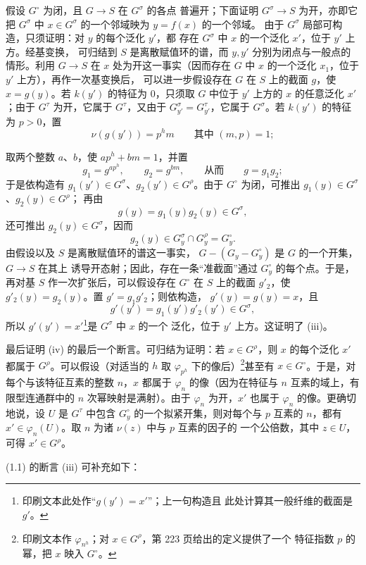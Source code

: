 假设 $G^\circ$ 为闭，且 $G\longrightarrow S$ 在 $G^\sigma$ 的各点
普遍开；下面证明 $G^\sigma\longrightarrow S$ 为开，亦即它把
$G^\sigma$ 中 $x\in G^\sigma$ 的一个邻域映为 $y=f(x)$ 的一个邻域。
由于 $G^\sigma$ 局部可构造，只须证明：对 $y$ 的每个泛化 $y'$，都
存在 $G^\sigma$ 中 $x$ 的一个泛化 $x'$，位于 $y'$ 上方。经基变换，
可归结到 $S$ 是离散赋值环的谱，而 $y,y'$ 分别为闭点与一般点的
情形。利用 $G\longrightarrow S$ 在 $x$ 处为开这一事实（因而存在
$G$ 中 $x$ 的一个泛化 $x_1$，位于 $y'$ 上方），再作一次基变换后，
可以进一步假设存在 $G$ 在 $S$ 上的截面 $g$，使 $x=g(y)$。若
$k(y')$ 的特征为 0，只须取 $G$ 中位于 $y'$ 上方的 $x$ 的任意泛化
$x'$；由于 $G^\tau$ 为开，它属于 $G^\tau$，又由于
$G_{y'}^\sigma=G_{y'}^\tau$，它属于 $G^\sigma$。若 $k(y')$ 的特征为
$p>0$，置
\[
\nu(g(y'))=p^hm\qquad\text{其中 }(m,p)=1 ;
\]

取两个整数 $a$、$b$，使 $ap^h+bm=1$，并置
\[
g_1=g^{ap^h},\qquad g_2=g^{bm},\qquad\text{从而}\qquad g=g_1g_2 ;
\]
于是依构造有 $g_1(y')\in G^\sigma$、$g_2(y')\in G^\rho$。由于
$G^\circ$ 为闭，可推出 $g_1(y)\in G^\sigma$、$g_2(y)\in G^\rho$；
再由
\[
g(y)=g_1(y)g_2(y)\in G^\sigma,
\]
还可推出 $g_2(y)\in G^\sigma$，因而
\[
g_2(y)\in G_y^\sigma\cap G_y^\rho=G_y^\circ.
\]
由假设以及 $S$ 是离散赋值环的谱这一事实，
$G-(G_y-G_y^\circ)$ 是 $G$ 的一个开集，$G\longrightarrow S$ 在其上
诱导开态射；因此，存在一条“准截面”通过 $G_y^\circ$ 的每个点。于是，
再对基 $S$ 作一次扩张后，可以假设存在 $G^\circ$ 在 $S$ 上的截面
$g'_2$，使 $g'_2(y)=g_2(y)$。置 $g'=g_1g'_2$；则依构造，
$g'(y)=g(y)=x$，且
\[
g'(y')=g_1(y')g'_2(y')\in G^\sigma,
\]
所以 $g'(y')=x'$\footnote{印刷文本此处作“$g(y')=x'$”；上一句构造且
此处计算其一般纤维的截面是 $g'$。}是 $G^\sigma$ 中 $x$ 的一个
泛化，位于 $y'$ 上方。这证明了 (iii)。

最后证明 (iv) 的最后一个断言。可归结为证明：若 $x\in G^\rho$，则
$x$ 的每个泛化 $x'$ 都属于 $G^\rho$。可以假设（对适当的 $h$ 取
$\varphi_{p^h}$ 下的像后）\footnote{印刷文本作
$\varphi_{n^h}$；对 $x\in G^\rho$，第 223 页给出的定义提供了一个
特征指数 $p$ 的幂，把 $x$ 映入 $G^\circ$。}甚至有
$x\in G^\circ$。于是，对每个与该特征互素的整数 $n$，$x$ 都属于
$\varphi_n$ 的像（因为在特征与 $n$ 互素的域上，有限型连通群中的
$n$ 次幂映射是满射）。由于 $\varphi_n$ 为开，$x'$ 也属于
$\varphi_n$ 的像。更确切地说，设 $U$ 是 $G^\tau$ 中包含
$G_y^\circ$ 的一个拟紧开集，则对每个与 $p$ 互素的 $n$，都有
$x'\in\varphi_n(U)$。取 $n$ 为诸 $\nu(z)$ 中与 $p$ 互素的因子的
一个公倍数，其中 $z\in U$，可得 $x'\in G^\rho$。

(1.1) 的断言 (iii) 可补充如下：

